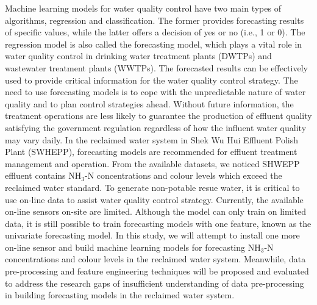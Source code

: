 Machine learning models for water quality control have two main types of algorithms, regression and classification. The former provides forecasting results of specific values, while the latter offers a decision of yes or no (i.e., 1 or 0). The regression model is also called the forecasting model, which plays a vital role in water quality control in drinking water treatment plants (DWTPs) and wastewater treatment plants (WWTPs). The forecasted results can be effectively used to provide critical information for the water quality control strategy. The need to use forecasting models is to cope with the unpredictable nature of water quality and to plan control strategies ahead. Without future information, the treatment operations are less likely to guarantee the production of effluent quality satisfying the government regulation \cite{chenAssessingWastewaterReclamation2003} regardless of how the influent water quality may vary daily. In the reclaimed water system in Shek Wu Hui Effluent Polish Plant (SWHEPP), forecasting models are recommended for effluent treatment management and operation. From the available datasets, we noticed SHWEPP effluent contains NH$_{3}$-N concentrations and colour levels which exceed the reclaimed water standard. To generate non-potable resue water, it is critical to use on-line data to assist water quality control strategy. Currently, the available on-line sensors on-site are limited. Although the model can only train on limited data, it is still possible to train forecasting models with one feature, known as the univariate forecasting model. In this study, we will attempt to install one more on-line sensor and build machine learning models for forecasting NH$_{3}$-N concentrations and colour levels in the reclaimed water system. Meanwhile, data pre-processing and feature engineering techniques will be proposed and evaluated to address the research gaps of insufficient understanding of data pre-processing in building forecasting models in the reclaimed water system.





